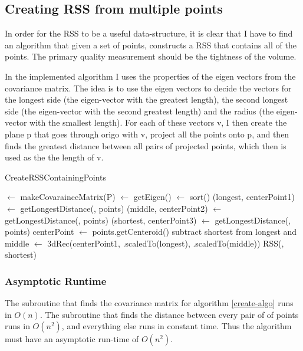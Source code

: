\subsection{Creating RSS from multiple points}
In order for the RSS to be a useful data-structure, it is clear that I have to find an algorithm that given a set of points, constructs a RSS that contains all of the points. The primary quality measurement should be the tightness of the volume.

In the implemented algorithm I uses the properties of the eigen vectors from the covariance matrix. The idea is to use the eigen vectors to decide the vectors for the longest side (the eigen-vector with the greatest length), the second longest side (the eigen-vector with the second greatest length) and the radius (the eigen-vector with the smallest length). For each of these vectors v, I then create the plane p that goes through origo with v, project all the points onto p, and then finds the greatest distance between all pairs of projected points, which then is used as the the length of v.
\begin{algorithm}[H]
  \caption{CreateRSSContainingPoints}
  \label{create-algo}
   
  \dontprintsemicolon
  \covar $\gets$ makeCovarainceMatrix(P)\;
  \eigen $\gets$ getEigen(\covar) \;
  \eigen $\gets$ sort(\eigen) \;
  (longest, centerPoint1) $\gets$ getLongestDistance(\eigen[2], points) \;
  (middle, centerPoint2) $\gets$ getLongestDistance(\eigen[1], points) \;
  (shortest, centerPoint3) $\gets$ getLongestDistance(\eigen[0], points) \;
  centerPoint $\gets$ points.getCenteroid() \;
  subtract shortest from longest and middle
  \threedeeRec $\gets$ 3dRec(centerPoint1, \eigen[2].scaledTo(longest), \eigen[1].scaledTo(middle)) \;
  \return RSS(\threedeeRec, shortest) \;
\end{algorithm}

\subsubsection{Asymptotic Runtime}
The subroutine that finds the covariance matrix for algorithm \ref{create-algo} runs in $O(n)$. The subroutine that finds the distance between every pair of of points runs in $O(n^2)$, and everything else runs in constant time. Thus the algorithm must have an asymptotic run-time of $O(n^2)$.

